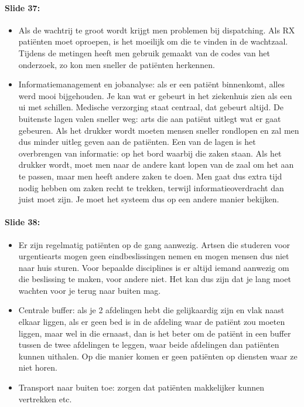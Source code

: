 \documentclass[10pt,a4paper]{report}
\begin{document}
\paragraph{Slide 37:}
\begin{itemize} 
\item Als de wachtrij te groot wordt krijgt men problemen bij dispatching. Als RX pati\"enten moet oproepen, is het moeilijk om die te vinden in de wachtzaal. Tijdens de metingen heeft men gebruik gemaakt van de codes van het onderzoek, zo kon men sneller de pati\"enten herkennen. 
\item Informatiemanagement en jobanalyse: als er een pati\"ent binnenkomt, alles werd mooi bijgehouden. Je kan wat er gebeurt in het ziekenhuis zien als een ui met schillen. Medische verzorging staat centraal, dat gebeurt altijd. De buitenste lagen valen sneller weg: arts die aan pati\"ent uitlegt wat er gaat gebeuren. Als het drukker wordt moeten mensen sneller rondlopen en zal men dus minder uitleg geven aan de pati\"enten. Een van de lagen is het overbrengen van informatie: op het bord waarbij die zaken staan. Als het drukker wordt, moet men naar de andere kant lopen van de zaal om het aan te passen, maar men heeft andere zaken te doen. Men gaat dus extra tijd nodig hebben om zaken recht te trekken, terwijl informatieoverdracht dan juist moet zijn. Je moet het systeem dus op een andere manier bekijken. 
\end{itemize}

\paragraph{Slide 38:}
\begin{itemize} 
\item Er zijn regelmatig pati\"enten op de gang aanwezig. Artsen die studeren voor urgentiearts mogen geen eindbeslissingen nemen en mogen mensen dus niet naar huis sturen. Voor bepaalde disciplines is er altijd iemand aanwezig om die beslissing te maken, voor andere niet. Het kan dus zijn dat je lang moet wachten voor je terug naar buiten mag. 
\item Centrale buffer: als je 2 afdelingen hebt die gelijkaardig zijn en vlak naast elkaar liggen, als er geen bed  is in de afdeling waar de pati\"ent zou moeten liggen, maar wel in die ernaast, dan is het beter om de pati\"ent in een buffer tussen de twee afdelingen te leggen, waar beide afdelingen dan pati\"enten kunnen uithalen. Op die manier komen er geen pati\"enten op diensten waar ze niet horen.
\item Transport naar buiten toe: zorgen dat pati\"enten makkelijker kunnen vertrekken etc.
\end{itemize}
\end{document}
